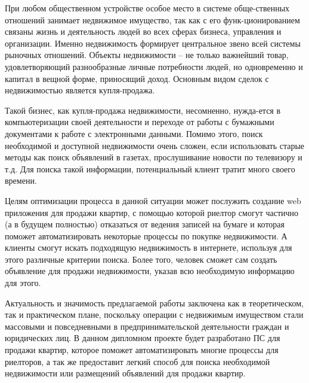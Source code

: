 \label{sec:intro}
При любом общественном устройстве особое место в системе обще-ственных отношений занимает недвижимое имущество, так как с его функ-ционированием связаны жизнь и деятельность людей во всех сферах бизнеса, управления и организации. Именно недвижимость формирует центральное звено всей системы рыночных отношений. Объекты недвижимости – не только важнейший товар, удовлетворяющий разнообразные личные потребности людей, но одновременно и капитал в вещной форме, приносящий доход. Основным видом сделок с недвижимостью является купля-продажа. 

Такой бизнес, как купля-продажа недвижимости, несомненно, нужда-ется в компьютеризации своей деятельности и переходе от работы с бумажными документами к работе с электронными данными. Помимо этого, поиск необходимой и доступной недвижимости очень сложен, если использовать старые методы как поиск объявлений в газетах, прослушивание новости по телевизору и т.д. Для поиска такой информации, потенциальный клиент тратит много своего времени. 

Целям оптимизации процесса в данной ситуации может послужить создание web приложения для продажи квартир, с помощью которой риелтор смогут частично (а в будущем полностью) отказаться от ведения записей на бумаге и которая поможет автоматизировать некоторые процессы по покупке недвижимости. А клиенты смогут искать подходящую недвижимость в интернете, используя для этого различные критерии поиска. Более того, человек сможет сам создать объявление для продажи недвижимости, указав всю необходимую информацию для этого.

Актуальность и значимость предлагаемой работы заключена как в теоретическом, так и практическом плане, поскольку операции с недвижимым имуществом стали массовыми и повседневными в предпринимательской деятельности граждан и юридических лиц. В данном дипломном проекте будет разработано ПС для продажи квартир, которое поможет автоматизировать многие процессы для риелторов, а так же предоставит легкий способ для поиска необходимой недвижимости или размещений объявлений для продажи квартир.
